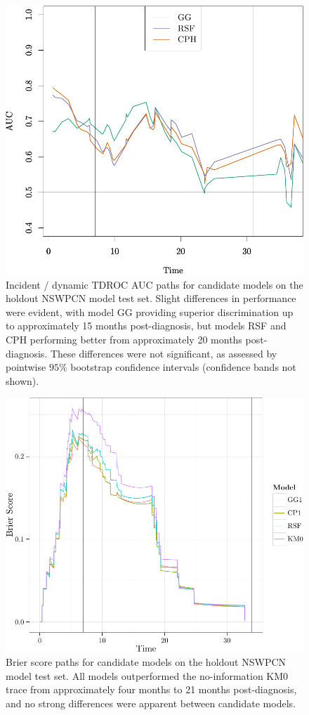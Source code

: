 \documentclass[dissertation.tex]{subfiles}
\begin{document}
\begin{figure}
\centering
  \includegraphics[width=.7\linewidth]{analysis/nomogram/figure/05-model-selection-roc-id-1}
  \caption[Time-dependent \acrshort{AUC} paths for candidate models on holdout data]{Incident / dynamic \gls{TDROC} \gls{AUC} paths for candidate models on the holdout \gls{NSWPCN} model test set.  Slight differences in performance were evident, with model GG providing superior discrimination up to approximately 15 months post-diagnosis, but models RSF and CPH performing better from approximately 20 months post-diagnosis.  These differences were not significant, as assessed by pointwise $95\%$ bootstrap confidence intervals (confidence bands not shown).}
\label{fig:nomo-tdauc-paths}
\end{figure}

\begin{figure}
\centering
  \includegraphics[width=.7\linewidth]{analysis/nomogram/figure/05-model-selection-bs-paths-1}
  \caption[Brier score paths for candidate models on holdout data]{Brier score paths for candidate models on the holdout \gls{NSWPCN} model test set.  All models outperformed the no-information KM0 trace from approximately four months to 21 months post-diagnosis, and no strong differences were apparent between candidate models.}
\label{fig:nomo-brier-paths}
\end{figure}
\end{document}
